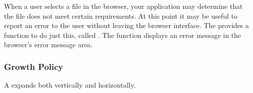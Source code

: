 When a user selects a file in the browser, your application may
determine that the file does not meet certain requirements.  At this
point it may be useful to report an error to the user without leaving
the browser interface.  The  provides a function to do
just this, called .  The function displays an
error message in the browser's error message area.


\subsubsection{Growth Policy}

A  expands both vertically and horizontally.
